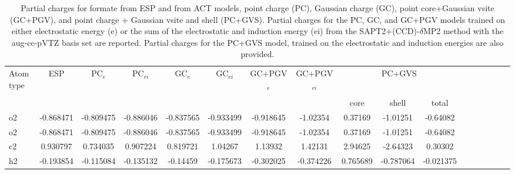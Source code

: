 \begin{sidewaystable}
\caption{Partial charges for formate from ESP and from ACT models, point charge (PC), Gaussian charge (GC), point core+Gaussian vsite (GC+PGV), and point charge + Gaussian vsite and shell (PC+GVS).  Partial charges for the PC, GC, and GC+PGV models trained on either electrostatic energy (e) or the sum of the electrostatic and induction energy (ei) from the SAPT2+(CCD)-$\delta$MP2 method with the aug-cc-pVTZ basis set are reported. Partial charges for the PC+GVS model, trained on the electrostatic and induction energies are also provided.}
\hspace{-1cm}
\begin{tabular}{lcccccccccccccccc}
\hline
 Atom type & ESP & PC$_{e}$ & PC$_{ei}$ & GC$_{e}$ & GC$_{ei}$ & GC+PGV$_{e}$ & GC+PGV$_{ei}$ & \multicolumn{3}{c}{PC+GVS} \\\\
 & & & & & & & & core & shell & total \\
\hline
o2 & -0.868471 & -0.809475 & -0.886046 & -0.837565 & -0.933499 & -0.918645 & -1.02354 & 0.37169 & -1.01251 & -0.64082 \\
o2 & -0.868471 & -0.809475 & -0.886046 & -0.837565 & -0.933499 & -0.918645 & -1.02354 & 0.37169 & -1.01251 & -0.64082 \\
c2 & 0.930797 & 0.734035 & 0.907224 & 0.819721 & 1.04267 & 1.13932 & 1.42131 & 2.94625 & -2.64323 & 0.30302 \\
h2 & -0.193854 & -0.115084 & -0.135132 & -0.14459 & -0.175673 & -0.302025 & -0.374226 & 0.765689 & -0.787064 & -0.021375 \\
\hline
\end{tabular}
\end{sidewaystable}
